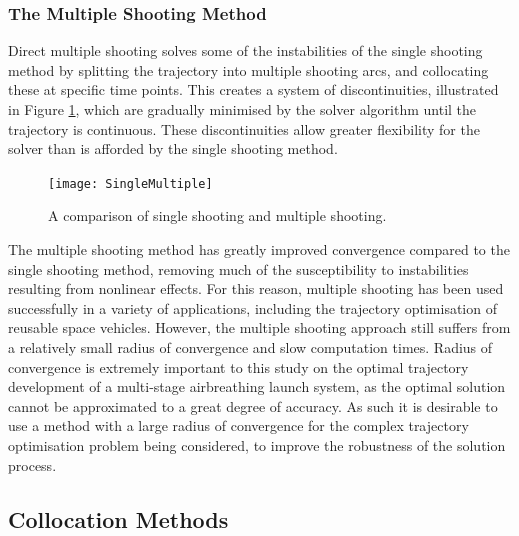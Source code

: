 \subsubsection{The Multiple Shooting Method}
Direct multiple shooting solves some of the instabilities of the single shooting method by splitting the trajectory into multiple shooting arcs, and collocating these at specific time points\cite{Betts1998,Kelly2015,Rao2009,Fasano2013}. This creates a system of discontinuities, illustrated in Figure \ref{fig:multipleshooting}, which are gradually minimised by the solver algorithm until the trajectory is continuous. These discontinuities allow greater flexibility for the solver than is afforded by the single shooting method. 

\begin{figure}[ht]
	\centering
	\texttt{[image: SingleMultiple]}
	\caption{A comparison of single shooting and multiple shooting\cite{Kelly2015}.}
	\label{fig:multipleshooting}
\end{figure}

The multiple shooting method has greatly improved convergence compared to the single shooting method, removing much of the susceptibility to instabilities resulting from nonlinear effects. For this reason, multiple shooting has been used successfully in a variety of applications, including the trajectory optimisation of reusable space vehicles\cite{Maddock2018}. However, the multiple shooting approach still suffers from a relatively small radius of convergence and slow computation times\cite{Fasano2013}. Radius of convergence is extremely important to this study on the optimal trajectory development of a multi-stage airbreathing launch system, as the optimal solution cannot be approximated to a great degree of accuracy. As such it is desirable to use a method with a large radius of convergence for the complex trajectory optimisation problem being considered, to improve the robustness of the solution process.

\subsection{Collocation Methods}

